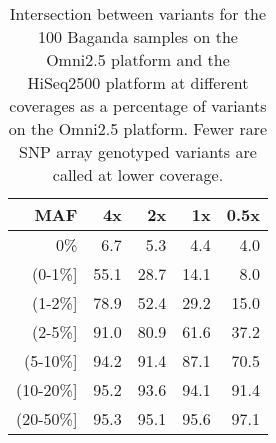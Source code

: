 \begin{table}[htp]
\centering
\begin{tabular}{r|rrrr}
{\gls{MAF}} & {4x} & {2x} & {1x} & {0.5x} \\ \hline
0\%                        & 6.7                       & 5.3                       & 4.4                       & 4.0                         \\
(0-1\%{]}                  & 55.1                      & 28.7                      & 14.1                      & 8.0                         \\
(1-2\%{]}                  & 78.9                      & 52.4                      & 29.2                      & 15.0                        \\
(2-5\%{]}                  & 91.0                      & 80.9                      & 61.6                      & 37.2                        \\
(5-10\%{]}                 & 94.2                      & 91.4                      & 87.1                      & 70.5                        \\
(10-20\%{]}                & 95.2                      & 93.6                      & 94.1                      & 91.4                        \\
(20-50\%{]}                & 95.3                      & 95.1                      & 95.6                      & 97.1 \\ \hline
\end{tabular}
\caption[Intersection of \glspl{SNP} between SNP array and sequence data at difference \glspl{AF}.]{Intersection between variants for the 100 Baganda samples on the Omni2.5 platform and the HiSeq2500 platform at different coverages as a percentage of variants on the Omni2.5 platform. Fewer rare SNP array genotyped variants are called at lower coverage.}
\label{tab:downsampling_omni_intersection}
\end{table}